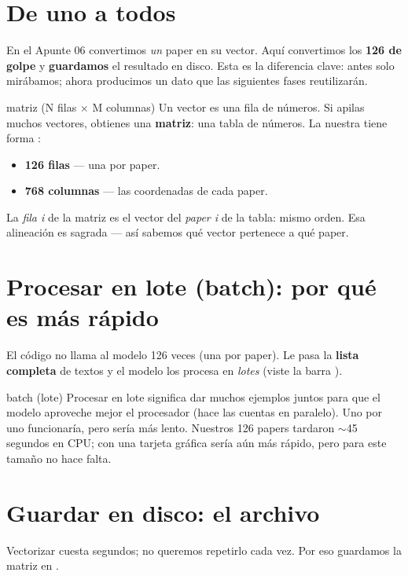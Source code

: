 \documentclass[11pt,a4paper]{article}
\begin{document}
\section{De uno a todos}

En el Apunte 06 convertimos \emph{un} paper en su vector. Aquí convertimos los
\textbf{126 de golpe} y \textbf{guardamos} el resultado en disco. Esta es la diferencia
clave: antes solo mirábamos; ahora producimos un dato que las siguientes fases reutilizarán.

\begin{concepto}{matriz (N filas $\times$ M columnas)}
Un vector es una fila de números. Si apilas muchos vectores, obtienes una \textbf{matriz}:
una tabla de números. La nuestra tiene forma :
\begin{itemize}
  \item \textbf{126 filas} --- una por paper.
  \item \textbf{768 columnas} --- las coordenadas de cada paper.
\end{itemize}
La \emph{fila i} de la matriz es el vector del \emph{paper i} de la tabla: mismo orden. Esa
alineación es sagrada --- así sabemos qué vector pertenece a qué paper.
\end{concepto}

\section{Procesar en lote (batch): por qué es más rápido}

El código no llama al modelo 126 veces (una por paper). Le pasa la \textbf{lista completa}
de textos y el modelo los procesa en \emph{lotes} (viste la barra ).

\begin{concepto}{batch (lote)}
Procesar en lote significa dar muchos ejemplos juntos para que el modelo aproveche mejor el
procesador (hace las cuentas en paralelo). Uno por uno funcionaría, pero sería más lento.
Nuestros 126 papers tardaron $\sim$45 segundos en CPU; con una tarjeta gráfica sería aún
más rápido, pero para este tamaño no hace falta.
\end{concepto}

\section{Guardar en disco: el archivo }

Vectorizar cuesta segundos; no queremos repetirlo cada vez. Por eso guardamos la matriz en
.
\end{document}
